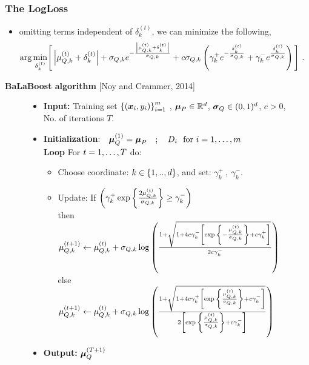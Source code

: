 \documentclass[mathserif]{beamer}
\begin{document}
\begin{frame}
\frametitle{ The LogLoss  }
\begin{itemize}
\item omitting terms independent of $\delta_k ^{(t)}$, we can minimize the following,
\begin{align*}
\arg\min_{\delta_k^{(t)}}&\Bigg[ \left\vert{\mu_{Q,k}^{(t)} +\delta_k^{(t)}
  }\right\vert +\sigma_{Q,k} e^{-\frac{\left\vert{\mu_{Q,k}^{(t)} +\delta_k^{(t)}
      }\right\vert}{\sigma_{Q,k}}}   +c\sigma_{Q,k}\left({\gamma_k^{+}e^{-\frac{\delta_k ^{(t)}}{\sigma_{Q,k}}}+\gamma_k^{-}e^{\frac{\delta_k ^{(t)}}{\sigma_{Q,k}}}}\right)  \Bigg] ~.
\end{align*}
\end{itemize}
\begin{exampleblock}{\textbf{BaLaBoost algorithm}  [Noy and Crammer, 2014]}
\begin{figure}[!h!]
\begin{itemize}
\item {\bf Input:} {Training set $\left\{{({\boldsymbol{x}}_{i},y_{i})}\right\}_{i=1}^m$ ,
  ${\boldsymbol{\mu}}_P\in \mathbb{R}^d$, ${\boldsymbol{\sigma}}_Q\in(0,1)^d$, $c>0$, No. of iterations $T$.   }\\
\item{\bf Initialization}:$\quad{\boldsymbol{\mu}}_Q^{(1)} ={\boldsymbol{\mu}}_P \quad; \quad D_{i} ~~ \textrm {for   } i = 1 , \ldots , m
$\\
{\bf Loop} For $t = 1 , \ldots , T$ do:
\nolineskips
\begin{itemize}
\item
Choose coordinate: $k\in \left\{{1,..,d}\right\}$,
and set: $\gamma_k^{+}~,~ \gamma_k^{-}$.

\item Update:
  If {$\left({\gamma_k^{+}\exp{\left\{{{\frac{2\mu_{Q,k}^{(t)}  }{\sigma_{Q,k}}}}\right\}}\geq\gamma_k^{-}}\right)$}
 \\then {$\mu_{Q,k}^{(t+1)}\leftarrow \mu_{Q,k}^{(t)}+  \sigma_{Q,k} \log{\left({ \frac{1+\sqrt{1+4c\gamma_k^{-}\left[{\exp{\left\{{-\frac{\mu_{Q,k}^{(t)} }{\sigma_{Q,k}}}\right\} }+c\gamma_k^{+}}\right] }}{2c\gamma_k^{-}}                    }\right)}$}
 \\else {$\mu_{Q,k}^{(t+1)}\leftarrow \mu_{Q,k}^{(t)}+  \sigma_{Q,k} \log{\left({ \frac{1+\sqrt{1+4c\gamma_k^{+}\left[{\exp{\left\{{\frac{\mu_{Q,k}^{(t)} }{\sigma_{Q,k}}}\right\} }+c\gamma _k^{-}}\right] }}{2 \left[{\exp{\left\{{\frac{\mu_{Q,k}^{(t)} }{\sigma_{Q,k}}}\right\} }+c\gamma_k^{-}}\right]    }                    }\right)}$
      }
\end{itemize}
\item {\bf Output:} ${\boldsymbol{\mu}}_Q^{(T+1)}$\\
\end{itemize}
\end{figure}
 \end{exampleblock}
\end{frame}
\end{document}
